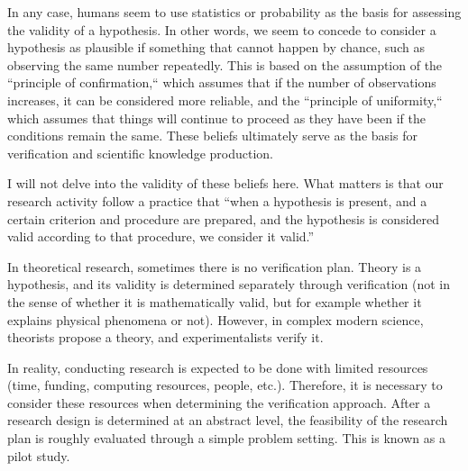 \documentclass{book}
\begin{document}
In any case, humans seem to use statistics or probability as the basis for assessing the validity of a hypothesis. In other words, we seem to concede to consider a hypothesis as plausible if something that cannot happen by chance, such as observing the same number repeatedly. This is based on the assumption of the ``principle of confirmation,`` which assumes that if the number of observations increases, it can be considered more reliable, and the ``principle of uniformity,`` which assumes that things will continue to proceed as they have been if the conditions remain the same. These beliefs ultimately serve as the basis for verification and scientific knowledge production. 

I will not delve into the validity of these beliefs here. What matters is that our research activity follow a practice that ``when a hypothesis is present, and a certain criterion and procedure are prepared, and the hypothesis is considered valid according to that procedure, we consider it valid.''

In theoretical research, sometimes there is no verification plan. Theory is a hypothesis, and its validity is determined separately through verification (not in the sense of whether it is mathematically valid, but for example whether it explains physical phenomena or not). However, in complex modern science, theorists propose a theory, and experimentalists verify it.


In reality, conducting research is expected to be done with limited resources (time, funding, computing resources, people, etc.). Therefore, it is necessary to consider these resources when determining the verification approach. After a research design is determined at an abstract level, the feasibility of the research plan is roughly evaluated through a simple problem setting. This is known as a pilot study.
\end{document}
